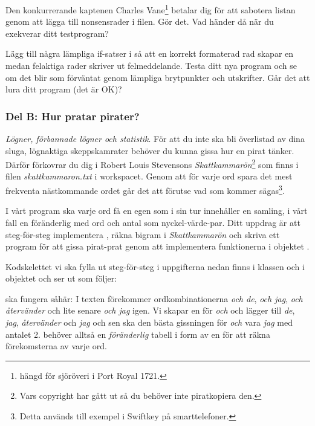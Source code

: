 \Subtask Den konkurrerande kaptenen Charles Vane\footnote{hängd för sjöröveri i Port Royal 1721.} betalar dig för att sabotera listan genom att lägga till nonsensrader i filen. Gör det. Vad händer då när du exekverar ditt testprogram?

\Subtask Lägg till några lämpliga if-satser i  så att en korrekt formaterad rad skapar en  medan felaktiga rader skriver ut felmeddelande. 
Testa ditt nya program och se om det blir som förväntat genom lämpliga brytpunkter och utskrifter. Går det att lura ditt program (det är OK)?

\subsubsection {Del B: Hur pratar pirater?}

\emph{Lögner, förbannade lögner och statistik}. För att du inte ska bli överlistad av dina sluga, lögnaktiga skeppskamrater behöver du kunna gissa hur en pirat tänker. Därför förkovrar du dig i Robert Louis Stevensons \emph{Skattkammarön}\footnote{Vars copyright har gått ut så du behöver inte piratkopiera den.} som finns i filen \emph{skattkammaron.txt} i workspacet.  Genom att för varje ord spara det mest frekventa nästkommande ordet går det att förutse vad som kommer sägas\footnote{Detta används till exempel i Swiftkey på smarttelefoner.}. 


I vårt program ska varje ord få en egen  som i sin tur innehåller en samling, i vårt fall en föränderlig  med ord och antal som nyckel-värde-par. Ditt uppdrag är att steg-för-steg implementera , räkna bigram i \emph{Skattkammarön} och skriva ett program för att gissa pirat-prat genom att implementera funktionerna i objektet . 

Kodskelettet vi ska fylla ut steg-för-steg i uppgifterna nedan finns i klassen  och i objektet  och ser ut som följer:
\newpage
{}
	 


 ska fungera såhär: I texten förekommer ordkombinationerna \emph{och de}, \emph{och jag}, \emph{och återvänder} och lite senare \emph{och jag} igen. Vi skapar en  för \emph{och} och lägger till \emph{de}, \emph{jag}, \emph{återvänder} och \emph{jag} och sen ska den bästa gissningen för \emph{och} vara \emph{jag} med antalet 2.  behöver alltså en \emph{föränderlig} tabell i form av en  för att räkna förekomsterna av varje ord.



